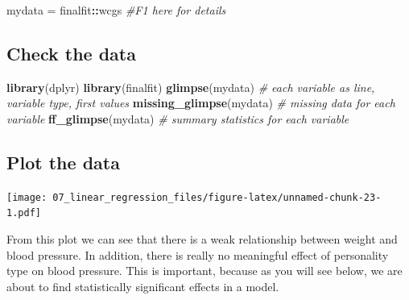 \documentclass[12pt,]{krantz}
\makeatletter
\newenvironment{Shaded}{\begin{snugshade}}{\end{snugshade}}
\newcommand{\CommentTok}[1]{\textcolor[rgb]{0.56,0.35,0.01}{\textit{#1}}}
\newcommand{\DataTypeTok}[1]{\textcolor[rgb]{0.13,0.29,0.53}{#1}}
\newcommand{\KeywordTok}[1]{\textcolor[rgb]{0.13,0.29,0.53}{\textbf{#1}}}
\newcommand{\NormalTok}[1]{#1}
\newcommand{\OperatorTok}[1]{\textcolor[rgb]{0.81,0.36,0.00}{\textbf{#1}}}
\newcommand{\OtherTok}[1]{\textcolor[rgb]{0.56,0.35,0.01}{#1}}
\newcommand{\StringTok}[1]{\textcolor[rgb]{0.31,0.60,0.02}{#1}}
\newenvironment{kframe}{%
\medskip{}
\setlength{\fboxsep}{.8em}
 \def\at@end@of@kframe{}%
 \ifinner\ifhmode%
  \def\at@end@of@kframe{\end{minipage}}%
  \begin{minipage}{\columnwidth}%
 \fi\fi%
 \def\FrameCommand##1{\hskip\@totalleftmargin \hskip-\fboxsep
 \colorbox{shadecolor}{##1}\hskip-\fboxsep
     \hskip-\linewidth \hskip-\@totalleftmargin \hskip\columnwidth}%
 \MakeFramed {\advance\hsize-\width
   \@totalleftmargin\z@ \linewidth\hsize
   \@setminipage}}%
 {\par\unskip\endMakeFramed%
 \at@end@of@kframe}
\renewenvironment{Shaded}{\begin{kframe}}{\end{kframe}}
\theoremstyle{definition}
\theoremstyle{definition}
\theoremstyle{definition}
\theoremstyle{remark}
\makeatother
\begin{document}
\begin{Shaded}
\begin{Highlighting}[]
\NormalTok{mydata =}\StringTok{ }\NormalTok{finalfit}\OperatorTok{::}\NormalTok{wcgs }\CommentTok{#F1 here for details}
\end{Highlighting}
\end{Shaded}

\hypertarget{check-the-data-2}{%
\subsection{Check the data}\label{check-the-data-2}}

\begin{Shaded}
\begin{Highlighting}[]
\KeywordTok{library}\NormalTok{(dplyr)}
\KeywordTok{library}\NormalTok{(finalfit)}
\KeywordTok{glimpse}\NormalTok{(mydata) }\CommentTok{# each variable as line, variable type, first values}
\KeywordTok{missing_glimpse}\NormalTok{(mydata) }\CommentTok{# missing data for each variable}
\KeywordTok{ff_glimpse}\NormalTok{(mydata) }\CommentTok{# summary statistics for each variable}
\end{Highlighting}
\end{Shaded}

\hypertarget{plot-the-data-3}{%
\subsection{Plot the data}\label{plot-the-data-3}}

\begin{Shaded}
\end{Shaded}

\texttt{[image: 07\_linear\_regression\_files/figure-latex/unnamed-chunk-23-1.pdf]}

From this plot we can see that there is a weak relationship between
weight and blood pressure. In addition, there is really no meaningful
effect of personality type on blood pressure. This is important, because
as you will see below, we are about to find statistically significant
effects in a model.
\end{document}
